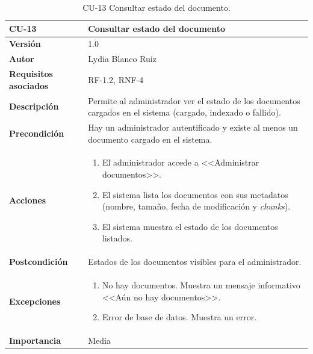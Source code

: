 \begin{table}[p]
	\centering
	\begin{tabularx}{\linewidth}{ p{} p{} }
		\toprule
		\textbf{CU-13}    & \textbf{Consultar estado del documento}\\
		\toprule
		\textbf{Versión}              & 1.0    \\
		\textbf{Autor}                & Lydia Blanco Ruiz \\
		\textbf{Requisitos asociados} & RF-1.2, RNF-4 \\
		\textbf{Descripción}          & Permite al administrador ver el estado de los documentos cargados en el sistema (cargado, indexado o fallido). \\
		\textbf{Precondición}         & Hay un administrador autentificado y existe al menos un documento cargado en el sistema. \\
		\textbf{Acciones}             &
		\begin{enumerate}
			\def\labelenumi{\arabic{enumi}.}
			\tightlist
			\item El administrador accede a <<Administrar documentos>>.
			\item El sistema lista los documentos con sus metadatos (nombre, tamaño, fecha de modificación y \textit{chunks}).
			\item El sistema muestra el estado de los documentos listados.
		\end{enumerate}\\
		\textbf{Postcondición}        & Estados de los documentos visibles para el administrador. \\
		\textbf{Excepciones}          & 
		\begin{enumerate}
			\def\labelenumi{\arabic{enumi}.}
			\tightlist
			\item No hay documentos. Muestra un mensaje informativo <<Aún no hay documentos>>.
			\item Error de base de datos. Muestra un error.
		\end{enumerate}\\
		\textbf{Importancia}          & Media  \\
		\bottomrule
	\end{tabularx}
	\caption{CU-13 Consultar estado del documento.}
\end{table}

